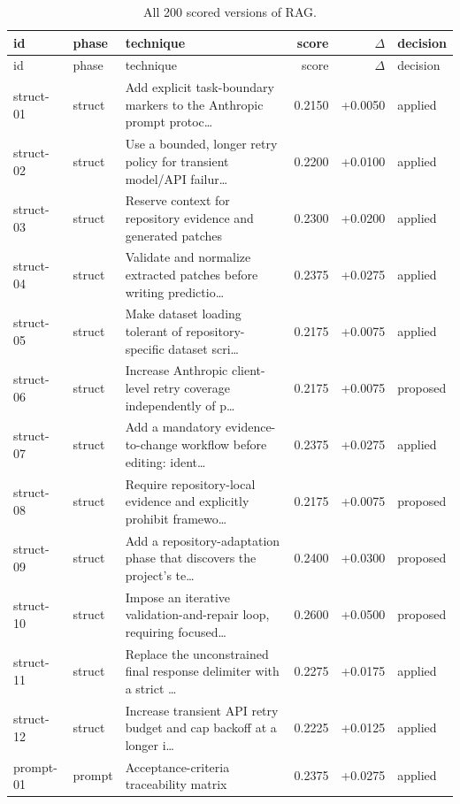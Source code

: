 \begin{center}\scriptsize\begin{longtable}{llp{5.2cm}rrl}
\caption{All 200 scored versions of RAG.}\\
\toprule id & phase & technique & score & $\Delta$ & decision \\ \midrule \endfirsthead
\toprule id & phase & technique & score & $\Delta$ & decision \\ \midrule \endhead
struct-01 & struct & Add explicit task-boundary markers to the Anthropic prompt protoc\ldots{} & 0.2150 & +0.0050 & applied \\
struct-02 & struct & Use a bounded, longer retry policy for transient model/API failur\ldots{} & 0.2200 & +0.0100 & applied \\
struct-03 & struct & Reserve context for repository evidence and generated patches & 0.2300 & +0.0200 & applied \\
struct-04 & struct & Validate and normalize extracted patches before writing predictio\ldots{} & 0.2375 & +0.0275 & applied \\
struct-05 & struct & Make dataset loading tolerant of repository-specific dataset scri\ldots{} & 0.2175 & +0.0075 & applied \\
struct-06 & struct & Increase Anthropic client-level retry coverage independently of p\ldots{} & 0.2175 & +0.0075 & proposed \\
struct-07 & struct & Add a mandatory evidence-to-change workflow before editing: ident\ldots{} & 0.2375 & +0.0275 & applied \\
struct-08 & struct & Require repository-local evidence and explicitly prohibit framewo\ldots{} & 0.2175 & +0.0075 & proposed \\
struct-09 & struct & Add a repository-adaptation phase that discovers the project's te\ldots{} & 0.2400 & +0.0300 & proposed \\
struct-10 & struct & Impose an iterative validation-and-repair loop, requiring focused\ldots{} & 0.2600 & +0.0500 & proposed \\
struct-11 & struct & Replace the unconstrained final response delimiter with a strict \ldots{} & 0.2275 & +0.0175 & applied \\
struct-12 & struct & Increase transient API retry budget and cap backoff at a longer i\ldots{} & 0.2225 & +0.0125 & applied \\
prompt-01 & prompt & Acceptance-criteria traceability matrix & 0.2375 & +0.0275 & applied \\

\end{longtable}
\end{center}
